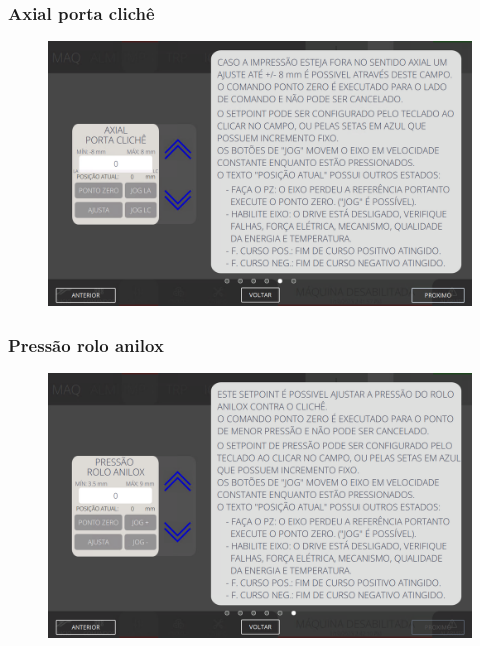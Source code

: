 \newpage
\thispagestyle{fancy}
\vspace*{\fill}
\subsubsection{\small{Axial porta clichê}} \label{sec:telaAjustesImpressoraAxialPortaCliche}
\vspace*{\fill}
\begin{figure}[h]
    \centering
    \includegraphics[width=576 px,height=360 px]{src/imagesICV/04-printters/02-printter/settings/e-5.png}
\end{figure}
\vspace*{\fill}

\newpage
\thispagestyle{fancy}
\vspace*{\fill}
\subsubsection{\small{Pressão rolo anilox}} \label{sec:telaAjustesImpressoraPressaoRoloAnilox}
\vspace*{\fill}
\begin{figure}[h]
    \centering
    \includegraphics[width=576 px,height=360 px]{src/imagesICV/04-printters/02-printter/settings/e-6.png}
\end{figure}
\vspace*{\fill}
